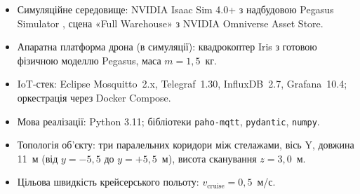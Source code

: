 \begin{itemize}[itemsep=2pt]
  \item Симуляційне середовище: NVIDIA Isaac Sim 4.0+ з надбудовою Pegasus Simulator \cite{Pegasus2024}, сцена «Full Warehouse» з NVIDIA Omniverse Asset Store.
  \item Апаратна платформа дрона (в симуляції): квадрокоптер Iris з готовою фізичною моделлю Pegasus, маса $m = 1{,}5$~кг.
  \item IoT-стек: Eclipse Mosquitto~2.x, Telegraf~1.30, InfluxDB~2.7, Grafana~10.4; оркестрація через Docker Compose.
  \item Мова реалізації: Python 3.11; бібліотеки \texttt{paho-mqtt}, \texttt{pydantic}, \texttt{numpy}.
  \item Топологія об'єкту: три паралельних коридори між стелажами, вісь Y, довжина 11~м (від $y=-5{,}5$ до $y=+5{,}5$~м), висота сканування $z=3{,}0$~м.
  \item Цільова швидкість крейсерського польоту: $v_{\text{cruise}} = 0{,}5$~м/с.
\end{itemize}
